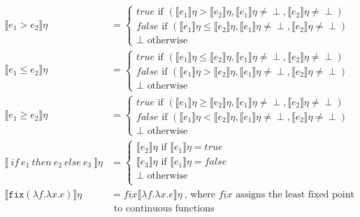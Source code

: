 \documentclass{westhesis}
\theoremstyle{plain}
\theoremstyle{definition}
\begin{document}
\begin{align*}
 \\
  \llbracket e_1 > e_2 \rrbracket\eta &= 
 \begin{cases} 
      true \text{ if } (\llbracket e_1 \rrbracket\eta > \llbracket e_2 \rrbracket\eta, \llbracket e_1 \rrbracket\eta \neq \perp, \llbracket e_2 \rrbracket\eta \neq \perp) \\
      false \text{  if } (\llbracket e_1 \rrbracket\eta \leq \llbracket e_2\rrbracket\eta, \llbracket e_1 \rrbracket\eta \neq \perp, \llbracket e_2 \rrbracket\eta \neq \perp)\\
      \perp \text{ otherwise}
   \end{cases}
 \\
  \llbracket e_1 \leq e_2 \rrbracket\eta &= 
 \begin{cases} 
      true \text{ if } (\llbracket e_1 \rrbracket\eta \leq \llbracket e_2 \rrbracket\eta, \llbracket e_1 \rrbracket\eta \neq \perp, \llbracket e_2 \rrbracket\eta \neq \perp) \\
      false \text{  if } (\llbracket e_1 \rrbracket\eta > \llbracket e_2\rrbracket\eta, \llbracket e_1 \rrbracket\eta \neq \perp, \llbracket e_2 \rrbracket\eta \neq \perp)\\
      \perp \text{ otherwise}
   \end{cases}
 \\
  \llbracket e_1 \geq e_2 \rrbracket\eta &= 
 \begin{cases} 
      true \text{ if } (\llbracket e_1 \rrbracket\eta \geq \llbracket e_2 \rrbracket\eta, \llbracket e_1 \rrbracket\eta \neq \perp, \llbracket e_2 \rrbracket\eta \neq \perp) \\
      false \text{  if } (\llbracket e_1 \rrbracket\eta < \llbracket e_2\rrbracket\eta, \llbracket e_1 \rrbracket\eta \neq \perp, \llbracket e_2 \rrbracket\eta \neq \perp)\\
      \perp \text{ otherwise}
   \end{cases}
 \\
  \llbracket \ if \ e_1 \ then \ e_2 \ else \ e_3 \ \rrbracket \eta &= 
 \begin{cases} 
      \llbracket e_2 \rrbracket\eta \text{ if } \llbracket e_1 \rrbracket\eta = true \\
      \llbracket e_3 \rrbracket\eta \text{ if } \llbracket e_1 \rrbracket\eta = false \\
      \perp \text{      otherwise} \\
   \end{cases}
  \\
   \llbracket  \texttt{fix} (\lambda f.\lambda x.e) \rrbracket\eta &= \underline{fix}\llbracket \lambda f.\lambda x.e \rrbracket\eta \
 \text{, where } \underline{fix} \text{ assigns the least fixed point} \\ 
 &\text{ \ \ \ \ \ \ \ \ \ \ \ \ \ \ \ \ \ \ \ \ \ \ \ to continuous functions} \\
 \end{align*}
\end{document}
